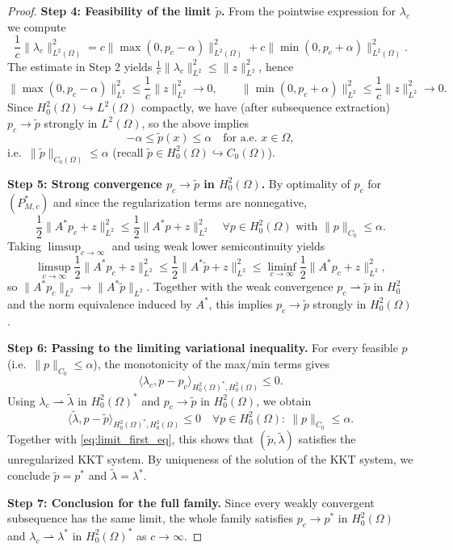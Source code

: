 \documentclass[11pt,a4paper]{article}
\begin{document}
\begin{proof}
\medskip\noindent
\textbf{Step 4: Feasibility of the limit $\tilde p$.}
From the pointwise expression for $\lambda_c$ we compute
\[
\frac1c\|\lambda_c\|_{L^2(\Omega)}^2
= c\|\max(0,p_c-\alpha)\|_{L^2(\Omega)}^2
+ c\|\min(0,p_c+\alpha)\|_{L^2(\Omega)}^2.
\]
The estimate in Step 2 yields $\frac1c\|\lambda_c\|_{L^2}^2\le \|z\|_{L^2}^2$, hence
\[
\|\max(0,p_c-\alpha)\|_{L^2}^2 \le \frac{1}{c}\|z\|_{L^2}^2 \to 0,
\qquad
\|\min(0,p_c+\alpha)\|_{L^2}^2 \le \frac{1}{c}\|z\|_{L^2}^2 \to 0.
\]
Since $H^2_0(\Omega)\hookrightarrow L^2(\Omega)$ compactly, we have (after subsequence extraction) $p_c\to\tilde p$ strongly in $L^2(\Omega)$, so the above implies
\[
-\alpha \le \tilde p(x)\le \alpha \quad\text{for a.e.\ }x\in\Omega,
\]
i.e.\ $\|\tilde p\|_{C_0(\Omega)}\le \alpha$ (recall $\tilde p\in H^2_0(\Omega)\hookrightarrow C_0(\Omega)$).

\medskip\noindent
\textbf{Step 5: Strong convergence $p_c\to\tilde p$ in $H^2_0(\Omega)$.}
By optimality of $p_c$ for $(P_{M,c}^\ast)$ and since the regularization terms are nonnegative,
\[
\frac12\|A^\ast p_c+z\|_{L^2}^2
\le
\frac12\|A^\ast p+z\|_{L^2}^2
\quad \forall p\in H^2_0(\Omega)\text{ with }\|p\|_{C_0}\le\alpha.
\]
Taking $\limsup_{c\to\infty}$ and using weak lower semicontinuity yields
\[
\limsup_{c\to\infty}\frac12\|A^\ast p_c+z\|_{L^2}^2
\le
\frac12\|A^\ast \tilde p+z\|_{L^2}^2
\le
\liminf_{c\to\infty}\frac12\|A^\ast p_c+z\|_{L^2}^2,
\]
so $\|A^\ast p_c\|_{L^2}\to\|A^\ast \tilde p\|_{L^2}$.
Together with the weak convergence $p_c\rightharpoonup \tilde p$ in $H^2_0$ and the norm equivalence induced by $A^\ast$, this implies $p_c\to\tilde p$ strongly in $H^2_0(\Omega)$.

\medskip\noindent
\textbf{Step 6: Passing to the limiting variational inequality.}
For every feasible $p$ (i.e.\ $\|p\|_{C_0}\le\alpha$), the monotonicity of the max/min terms gives
\[
\langle \lambda_c, p-p_c\rangle_{H^2_0(\Omega)^\ast,H^2_0(\Omega)} \le 0.
\]
Using $\lambda_c\rightharpoonup \tilde\lambda$ in $H^2_0(\Omega)^\ast$ and $p_c\to\tilde p$ in $H^2_0(\Omega)$, we obtain
\[
\langle \tilde\lambda, p-\tilde p\rangle_{H^2_0(\Omega)^\ast,H^2_0(\Omega)} \le 0
\quad \forall p\in H^2_0(\Omega):\ \|p\|_{C_0}\le\alpha.
\]
Together with \eqref{eq:limit_first_eq}, this shows that $(\tilde p,\tilde\lambda)$ satisfies the unregularized KKT system.
By uniqueness of the solution of the KKT system, we conclude $\tilde p=p^\ast$ and $\tilde\lambda=\lambda^\ast$.

\medskip\noindent
\textbf{Step 7: Conclusion for the full family.}
Since every weakly convergent subsequence has the same limit, the whole family satisfies
$p_c\to p^\ast$ in $H^2_0(\Omega)$ and $\lambda_c\rightharpoonup \lambda^\ast$ in $H^2_0(\Omega)^\ast$ as $c\to\infty$.
\end{proof}
\end{document}
